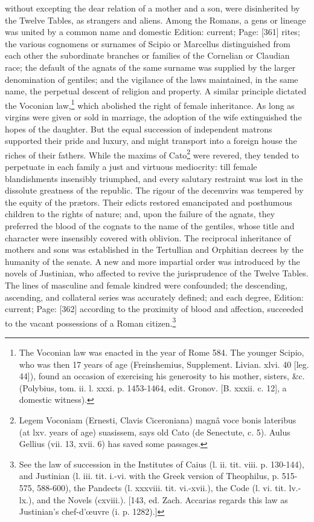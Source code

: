 without excepting the dear relation of a mother and a son, were disinherited by the Twelve Tables, as strangers and aliens. Among the Romans, a gens or lineage was united by a common name and domestic Edition: current; Page: [361] rites; the various cognomens or surnames of Scipio or Marcellus distinguished from each other the subordinate branches or families of the Cornelian or Claudian race; the default of the agnats of the same surname was supplied by the larger denomination of gentiles; and the vigilance of the laws maintained, in the same name, the perpetual descent of religion and property. A similar principle dictated the Voconian law,\footnote{The Voconian law was enacted in the year of Rome 584. The younger Scipio, who was then 17 years of age (Freinshemius, Supplement. Livian. xlvi. 40 [leg. 44]), found an occasion of exercising his generosity to his mother, sisters, \&c. (Polybius, tom. ii. l. xxxi. p. 1453-1464, edit. Gronov. [B. xxxii. c. 12], a domestic witness).} which abolished the right of female inheritance. As long as virgins were given or sold in marriage, the adoption of the wife extinguished the hopes of the daughter. But the equal succession of independent matrons supported their pride and luxury, and might transport into a foreign house the riches of their fathers. While the maxims of Cato\footnote{Legem Voconiam (Ernesti, Clavis Ciceroniana) magnâ voce bonis lateribus (at lxv. years of age) suasissem, says old Cato (de Senectute, c. 5). Aulus Gellius (vii. 13, xvii. 6) has saved some passages.} were revered, they tended to perpetuate in each family a just and virtuous mediocrity: till female blandishments insensibly triumphed, and every salutary restraint was lost in the dissolute greatness of the republic. The rigour of the decemvirs was tempered by the equity of the prætors. Their edicts restored emancipated and posthumous children to the rights of nature; and, upon the failure of the agnats, they preferred the blood of the cognats to the name of the gentiles, whose title and character were insensibly covered with oblivion. The reciprocal inheritance of mothers and sons was established in the Tertullian and Orphitian decrees by the humanity of the senate. A new and more impartial order was introduced by the novels of Justinian, who affected to revive the jurisprudence of the Twelve Tables. The lines of masculine and female kindred were confounded; the descending, ascending, and collateral series was accurately defined; and each degree, Edition: current; Page: [362] according to the proximity of blood and affection, succeeded to the vacant possessions of a Roman citizen.\footnote{See the law of succession in the Institutes of Caius (l. ii. tit. viii. p. 130-144), and Justinian (l. iii. tit. i.-vi. with the Greek version of Theophilus, p. 515-575, 588-600), the Pandects (l. xxxviii. tit. vi.-xvii.), the Code (l. vi. tit. lv.-lx.), and the Novels (cxviii.). [143, ed. Zach. Accarias regards this law as Justinian\texthebrew{}’s chef-d\texthebrew{}’œuvre (i. p. 1282).]}

